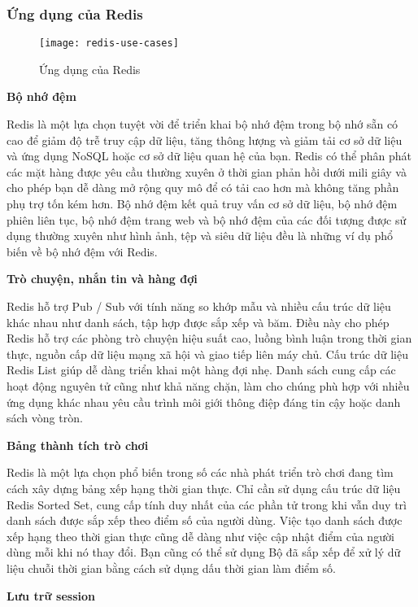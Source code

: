 \subsubsection{Ứng dụng của Redis}

\begin{figure}[ht]
	\centering
	\texttt{[image: redis-use-cases]}
	\caption{Ứng dụng của Redis}
\end{figure}

\textbf{Bộ nhớ đệm}

Redis là một lựa chọn tuyệt vời để triển khai bộ nhớ đệm trong bộ nhớ sẵn có cao để giảm độ trễ truy cập dữ liệu, tăng thông lượng và giảm tải cơ sở dữ liệu và ứng dụng NoSQL hoặc cơ sở dữ liệu quan hệ của bạn. Redis có thể phân phát các mặt hàng được yêu cầu thường xuyên ở thời gian phản hồi dưới mili giây và cho phép bạn dễ dàng mở rộng quy mô để có tải cao hơn mà không tăng phần phụ trợ tốn kém hơn. Bộ nhớ đệm kết quả truy vấn cơ sở dữ liệu, bộ nhớ đệm phiên liên tục, bộ nhớ đệm trang web và bộ nhớ đệm của các đối tượng được sử dụng thường xuyên như hình ảnh, tệp và siêu dữ liệu đều là những ví dụ phổ biến về bộ nhớ đệm với Redis.

\textbf{Trò chuyện, nhắn tin và hàng đợi}

Redis hỗ trợ Pub / Sub với tính năng so khớp mẫu và nhiều cấu trúc dữ liệu khác nhau như danh sách, tập hợp được sắp xếp và băm. Điều này cho phép Redis hỗ trợ các phòng trò chuyện hiệu suất cao, luồng bình luận trong thời gian thực, nguồn cấp dữ liệu mạng xã hội và giao tiếp liên máy chủ. Cấu trúc dữ liệu Redis List giúp dễ dàng triển khai một hàng đợi nhẹ. Danh sách cung cấp các hoạt động nguyên tử cũng như khả năng chặn, làm cho chúng phù hợp với nhiều ứng dụng khác nhau yêu cầu trình môi giới thông điệp đáng tin cậy hoặc danh sách vòng tròn.

\textbf{Bảng thành tích trò chơi}

Redis là một lựa chọn phổ biến trong số các nhà phát triển trò chơi đang tìm cách xây dựng bảng xếp hạng thời gian thực. Chỉ cần sử dụng cấu trúc dữ liệu Redis Sorted Set, cung cấp tính duy nhất của các phần tử trong khi vẫn duy trì danh sách được sắp xếp theo điểm số của người dùng. Việc tạo danh sách được xếp hạng theo thời gian thực cũng dễ dàng như việc cập nhật điểm của người dùng mỗi khi nó thay đổi. Bạn cũng có thể sử dụng Bộ đã sắp xếp để xử lý dữ liệu chuỗi thời gian bằng cách sử dụng dấu thời gian làm điểm số.

\textbf{Lưu trữ session}

